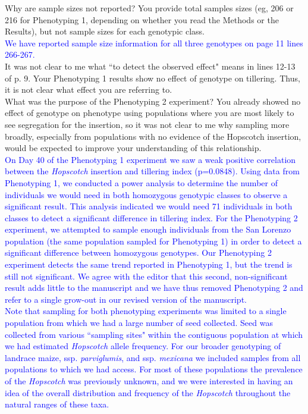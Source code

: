\documentclass[11pt]{article}
\newcommand{\res}[1]{\noindent \textcolor{blue}{{#1}} \\}
\begin{document}
Why are sample sizes not reported?  You provide total samples sizes (eg, 206 or 216 for Phenotyping 1, depending on whether you read the Methods or the Results), but not sample sizes for each genotypic class.\\

\res{We have reported sample size information for all three genotypes on page 11 lines 266-267.} 

It was not clear to me what ``to detect the observed effect" means in lines 12-13 of p. 9.  Your Phenotyping 1 results show no effect of genotype on tillering.  Thus, it is not clear what effect you are referring to.\\

What was the purpose of the Phenotyping 2  experiment?  You already showed no effect of genotype on phenotype using populations where you are most likely to see segregation for the insertion, so it was not clear to me why sampling more broadly, especially from populations with no evidence of the Hopscotch insertion, would be expected to improve your understanding of this relationship.\\

\res{On Day 40 of the Phenotyping 1 experiment we saw a weak positive correlation between the \emph{Hopscotch} insertion and tillering index (p=0.0848).  
Using data from Phenotyping 1, we conducted a power analysis to determine the number of individuals we would need in both homozygous genotypic classes to observe a significant result.
This analysis indicated we would need 71 individuals in both classes to detect a significant difference in tillering index.  
For the Phenotyping 2 experiment, we attempted to sample enough individuals from the San Lorenzo population (the same population sampled for Phenotyping 1) in order to detect a significant difference between homozygous genotypes.  
Our Phenotyping 2 experiment detects the same trend reported in Phenotyping 1, but the trend is still not significant.
We agree with the editor that this second, non-significant result adds little to the manuscript and we have thus removed Phenotyping 2 and refer to a single grow-out in our revised version of the manuscript.}

\res{Note that sampling for both phenotyping experiments was limited to a single population from which we had a large number of seed collected. Seed was collected from various ``sampling sites" within the contiguous population at which we had estimated \emph{Hopscotch} allele frequency. For our broader genotyping of landrace maize, ssp. \emph{parviglumis}, and ssp. \emph{mexicana} we included samples from all populations to which we had access. For most of these populations the prevalence of the \emph{Hopscotch} was previously unknown, and we were interested in having an idea of the overall distribution and frequency of the \emph{Hopscotch} throughout the natural ranges of these taxa.}
\end{document}
